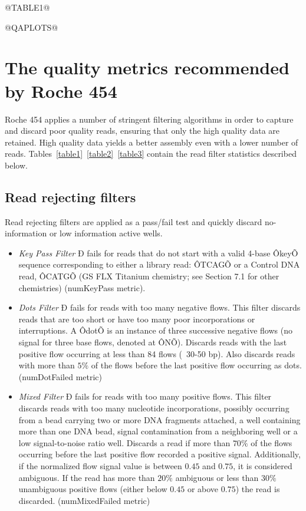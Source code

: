\documentclass[11pt]{article}
\begin{document}
\begin{center}
@TABLE1@
\end{center}


\begin{center}
@QAPLOTS@
\end{center}

\section{The quality metrics recommended by Roche 454}

Roche 454 applies a number of stringent filtering algorithms  in order to capture and discard poor quality reads,  ensuring that only the high quality data are retained. High quality data yields a better assembly even with a lower number of reads. Tables~\ref{table1}~\ref{table2}~\ref{table3} contain the read filter statistics described below.


\subsection{Read rejecting filters}

Read rejecting filters are applied as a pass/fail test and quickly discard no-information or low information active wells.

\begin{itemize}
\item \emph{Key Pass Filter} Ð fails for reads that do not start with a valid 4-base ÔkeyÕ sequence corresponding to either a library read: ÔTCAGÕ or a Control DNA read, ÔCATGÕ (GS FLX Titanium chemistry; see Section 7.1 for other chemistries) (numKeyPass metric).

\item \emph{Dots Filter} Ð fails for reads with too many negative flows. This filter discards reads that are too short or have too many poor incorporations or interruptions. A ÔdotÕ is an instance of three successive negative flows (no signal for three base flows, denoted at ÔNÕ). Discards reads with the last positive flow occurring at less than 84 flows (~30-50 bp). Also discards reads with more than $5\%$ of the flows before the last positive flow occurring as dots. (numDotFailed metric)

\item \emph{Mixed Filter} Ð fails for reads with too many positive flows. This filter discards reads with too many nucleotide incorporations, possibly occurring from a bead carrying two or more DNA fragments attached, a well containing more than one DNA bead, signal contamination from a neighboring well or a low signal-to-noise ratio well. Discards a read if more than $70\%$ of the flows occurring before the last positive flow recorded a positive signal. Additionally, if the normalized flow signal value is between $0.45$ and $0.75$, it is considered ambiguous. If the read has more than $20\%$  ambiguous or less than $30\%$ unambiguous positive flows (either below $0.45$ or above $0.75$) the read is discarded. (numMixedFailed metric)

\end{itemize}
\end{document}
